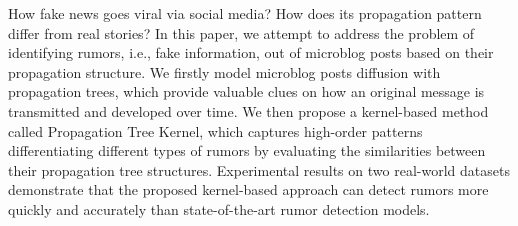 How fake news goes viral via social media? How does its propagation pattern differ from real stories? In this paper, we attempt to address the problem of identifying rumors, i.e., fake information, out of microblog posts based on their propagation structure. We firstly model microblog posts diffusion with propagation trees, which provide valuable clues on how an original message is transmitted and developed over time. We then propose a kernel-based method called Propagation Tree Kernel, which captures high-order patterns differentiating different types of rumors by evaluating the similarities between their propagation tree structures. Experimental results on two real-world datasets demonstrate that the proposed kernel-based approach can detect rumors more quickly and accurately than state-of-the-art rumor detection models.

